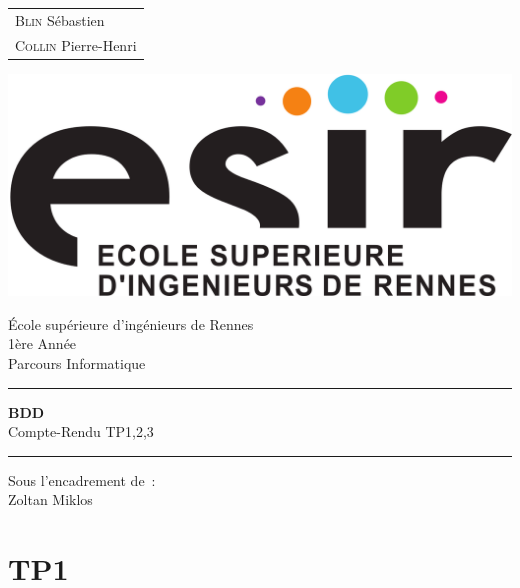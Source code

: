 \documentclass{article}
\begin{document}
\begin{titlepage}
	\vspace{-20px}
	\begin{tabular}{l}
		\textsc{Blin} S\'ebastien\\
		\textsc{Collin} Pierre-Henri
	\end{tabular}
	\hfill \vspace{10px}\includegraphics[scale=0.1]{esir.png}\\
	\vfill
	\begin{center}
		\Huge{\'Ecole sup\'erieure d'ing\'enieurs de Rennes}\\
		\vspace{1cm}
		\LARGE{1\`ere Ann\'ee}\\
		\large{Parcours Informatique}\\
		\vspace{0.5cm}\hrule\vspace{0.5cm}
		\LARGE{\textbf{BDD}}\\
		\Large{Compte-Rendu TP1,2,3}
		\vspace{0.5cm}\hrule
		\vfill
		\vfill
	\end{center}
	\begin{flushleft}
		\Large{Sous l'encadrement de~:}\\
		\vspace{0.2cm}
		\large{{Zoltan} Miklos}
	\end{flushleft}
	\vfill
\end{titlepage}

\section{TP1}
\end{document}
